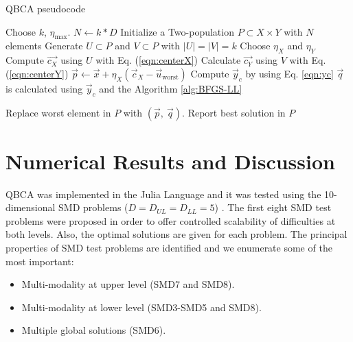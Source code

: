 \documentclass[conference]{IEEEtran}
\theoremstyle{definition}
\begin{document}
\begin{algorithm}[!ht]
    \caption{QBCA pseudocode}
    \label{alg:QBCA}
    \begin{algorithmic}[1]
        \STATE Choose $k$, $\eta_{\max}$.
        \STATE $N \gets k * D$
        \STATE Initialize a Two-population $P\subset X\times Y$ with $N$ elements
                \STATE Generate $U \subset P$ and $V \subset P$ with $|U| = |V| = k$
                \STATE Choose $\eta_{X}$ and $\eta_{Y}$
                \STATE Compute $\vec{c_X}$ using $U$ with Eq. (\ref{eqn:centerX})
                \STATE Calculate $\vec{c_Y}$ using $V$ with Eq. (\ref{eqn:centerY})
                \STATE $ \vec{p} \gets \vec{x} + \eta_{X} (\vec{c}_X - \vec{u}_{\text{worst}})$
                \STATE Compute $ \vec{y}_c $ by using Eq. \ref{eqn:yc}
                \STATE $ \vec{q} $ is calculated using $\vec{y}_c$ and the Algorithm \ref{alg:BFGS-LL}
                
                    \STATE Replace worst element in $P$ with $(\vec{p},\ \vec{q})$.
                \ENDIF
            \ENDFOR
        \ENDWHILE
        \STATE Report best solution in $P$
    \end{algorithmic}
\end{algorithm}

\section{Numerical Results and Discussion} %
\label{sec:numerical_result}

QBCA was implemented in the Julia Language \cite{bezanson2017julia} and it was
tested using the 10-dimensional SMD problems ($D = D_{UL} = D_{LL} = 5$)
\cite{sinha2014test,sinha2013efficient}. The first eight SMD test problems were
proposed in order to offer controlled scalability of difficulties at both levels.
Also, the optimal solutions are given for each problem. The principal properties
of SMD test problems are identified and we enumerate some of the most important:

\begin{itemize}
    \item Multi-modality at upper level (SMD7 and SMD8).
    \item Multi-modality at lower level (SMD3-SMD5 and SMD8).
    \item Multiple global solutions (SMD6).
\end{itemize}
\end{document}
